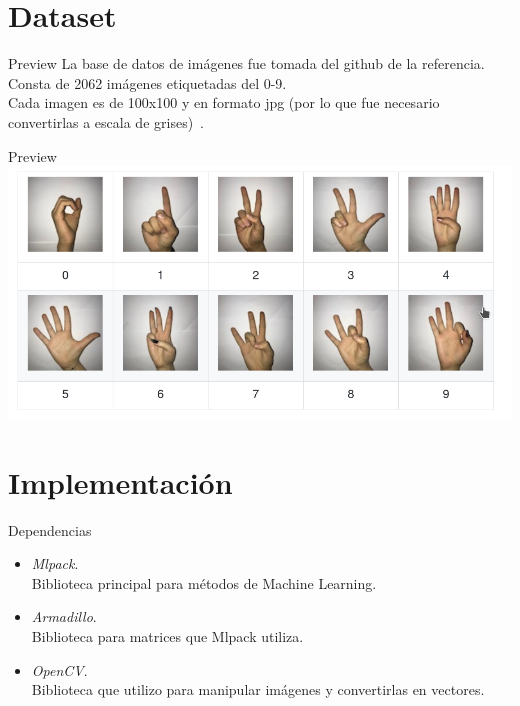 \documentclass{beamer}
\begin{document}
\begin{darkframes}
    \section{Dataset}
    
    \begin{frame}{Preview}
        La base de datos de imágenes fue tomada del github de la referencia.\\
        Consta de 2062 imágenes etiquetadas del 0-9.\\
        Cada imagen es de 100x100 y en formato jpg (por lo que fue necesario convertirlas a escala de grises)~\cite{git}.
    \end{frame}
    \begin{frame}{Preview}
        \includegraphics[scale=0.46]{dataset_preview}
    \end{frame}
    
    \section{Implementación}
    \begin{frame}{Dependencias}
        \begin{itemize}
         \item \emph{Mlpack}.\\
         Biblioteca principal para métodos de Machine Learning.\pause
         \item \emph{Armadillo}.\\
         Biblioteca para matrices que Mlpack utiliza.\pause
         \item \emph{OpenCV}.\\
         Biblioteca que utilizo para manipular imágenes y convertirlas en vectores.
        \end{itemize}

    \end{frame}
    

\end{darkframes}
\end{document}

